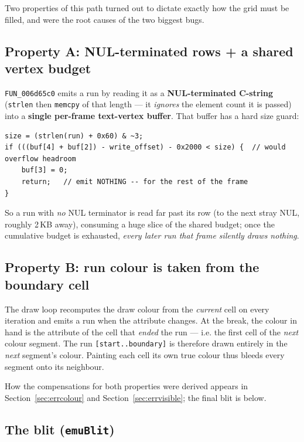 \documentclass[11pt]{article}
\newcommand{\ic}[1]{\texttt{#1}}
\begin{document}
Two properties of this path turned out to dictate exactly how the grid must be filled,
and were the root causes of the two biggest bugs.

\subsection{Property A: NUL-terminated rows + a shared vertex budget}
\label{sec:propA}

\ic{FUN_006d65c0} emits a run by reading it as a \textbf{NUL-terminated C-string}
(\ic{strlen} then \ic{memcpy} of that length --- it \emph{ignores} the element count it
is passed) into a \textbf{single per-frame text-vertex buffer}. That buffer has a hard
size guard:

\begin{lstlisting}
size = (strlen(run) + 0x60) & ~3;
if (((buf[4] + buf[2]) - write_offset) - 0x2000 < size) {  // would overflow headroom
    buf[3] = 0;
    return;   // emit NOTHING -- for the rest of the frame
}
\end{lstlisting}

\noindent
So a run with \emph{no} NUL terminator is read far past its row (to the next stray NUL,
roughly 2\,KB away), consuming a huge slice of the shared budget; once the cumulative
budget is exhausted, \emph{every later run that frame silently draws nothing}.

\subsection{Property B: run colour is taken from the boundary cell}
\label{sec:propB}

The draw loop recomputes the draw colour from the \emph{current} cell on every
iteration and emits a run when the attribute changes. At the break, the colour in hand
is the attribute of the cell that \emph{ended} the run --- i.e. the first cell of the
\emph{next} colour segment. The run \ic{[start..boundary]} is therefore drawn entirely
in the \emph{next} segment's colour. Painting each cell its own true colour thus bleeds
every segment onto its neighbour.

How the compensations for both properties were derived appears in
Section~\ref{sec:errcolour} and Section~\ref{sec:errvisible}; the final blit is below.

\subsection{The blit (\texttt{emuBlit})}
\end{document}
